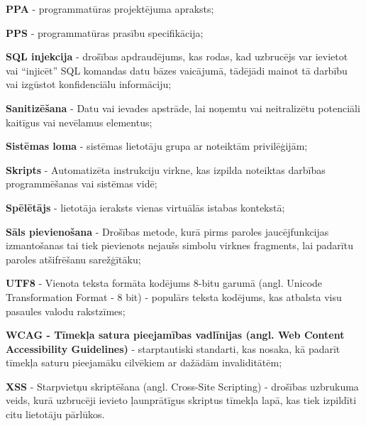 \textbf{PPA} - programmatūras projektējuma apraksts;

\textbf{PPS} - programmatūras prasību specifikācija;

\textbf{SQL injekcija} - drošības apdraudējums, kas rodas, kad uzbrucējs var ievietot vai ``injicēt'' SQL komandas datu bāzes vaicājumā, tādējādi mainot tā darbību vai izgūstot konfidenciālu informāciju;

\textbf{Sanitizēšana} - Datu vai ievades apstrāde, lai noņemtu vai neitralizētu potenciāli kaitīgus vai nevēlamus elementus;

\textbf{Sistēmas loma} - sistēmas lietotāju grupa ar noteiktām privilēģijām;

\textbf{Skripts} - Automatizēta instrukciju virkne, kas izpilda noteiktas darbības programmēšanas vai sistēmas vidē;

\textbf{Spēlētājs} - lietotāja ieraksts vienas virtuālās istabas kontekstā;

\textbf{Sāls pievienošana} - Drošības metode, kurā pirms paroles jaucējfunkcijas izmantošanas tai tiek pievienots nejaušs simbolu virknes fragments, lai padarītu paroles atšifrēšanu sarežģītāku;

\textbf{UTF8} - Vienota teksta formāta kodējums 8-bitu garumā (angl. Unicode Transformation Format - 8 bit) - populārs teksta kodējums, kas atbalsta visu pasaules valodu rakstzīmes;

\textbf{WCAG - Tīmekļa satura pieejamības vadlīnijas (angl. Web Content Accessibility Guidelines)} - starptautiski standarti, kas nosaka, kā padarīt tīmekļa saturu pieejamāku cilvēkiem ar dažādām invaliditātēm;

\textbf{XSS} - Starpvietņu skriptēšana (angl. Cross-Site Scripting) - drošības uzbrukuma veids, kurā uzbrucēji ievieto ļaunprātīgus skriptus tīmekļa lapā, kas tiek izpildīti citu lietotāju pārlūkos.



\setlength{\parindent}{1cm} %
